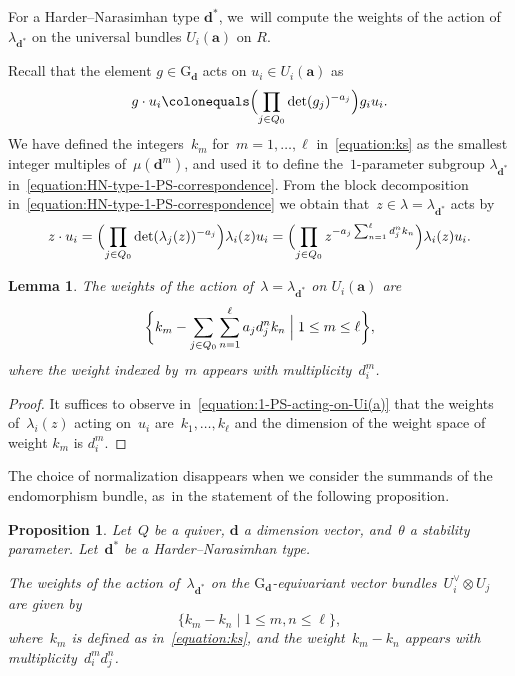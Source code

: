 \documentclass[JEP,XML,SOM,Unicode,NoEqCountersInSection,published]{cedram}
\theoremstyle{plain}
\newtheorem{lemma}[theorem]{Lemma}
\newtheorem{proposition}[theorem]{Proposition}
\theoremstyle{definition}
\newcommand\group[1][\tuple{d}]{\mathrm{G}_{#1}}
\newcommand\tuple[1]{\ensuremath{{\boldsymbol{#1}}}}
\begin{document}
For a Harder--Narasimhan type $\tuple{d}^*$, we~will compute the weights of the action of $\lambda_{\tuple{d}^*}$
on the universal bundles $U_i(\tuple{a})$ on $R$.

Recall that the element $g \in {\group}$ acts on $u_i \in U_i(\tuple{a})$ as
\begin{equation*}
g \cdot u_i \colonequals \Bigl(\prod_{j \in Q_0} \det(g_j)^{-a_j} \Bigr) g_i u_i.
\end{equation*}
We have defined the integers~$k_m$ for~$m=1,\ldots,\ell$ in~\eqref{equation:ks}
as the smallest integer multiples of~$\mu(\tuple{d}^m)$,
and used it to define the~$1$-parameter subgroup $\lambda_{\tuple{d}^*}$ in~\eqref{equation:HN-type-1-PS-correspondence}.
From the block decomposition in~\eqref{equation:HN-type-1-PS-correspondence}
we obtain that~$z\in\lambda=\lambda_{\tuple{d}^*}$ acts by
\begin{equation}
\label{equation:1-PS-acting-on-Ui(a)}
z \cdot u_i
= \Bigl(\prod_{j\in Q_0}\det(\lambda_j(z))^{-a_j}\Bigr)\lambda_i(z)u_i
= \Bigl(\prod_{j\in Q_0} z^{-a_j\sum_{n=1}^\ell d^n_j k_n}\Bigr) \lambda_i(z) u_i.
\end{equation}

\begin{lemma}
The weights of the action of~$\lambda=\lambda_{\tuple{d}^*}$
on $U_i(\tuple{a})$ are
\begin{equation}
\label{equation:weights-Ui(a)}
\biggl\{ k_m - \sum_{j \in Q_0} \sum_{n=1}^\ell a_j d^n_j k_n \Bigm| 1\leq m \leq \ell \biggr\},
\end{equation}
where the weight indexed by~$m$ appears with multiplicity~$d_i^m$.
\end{lemma}

\begin{proof}
It suffices to observe in~\eqref{equation:1-PS-acting-on-Ui(a)}
that the weights of~$\lambda_i(z)$ acting on~$u_i$ are~$k_1,\ldots,k_\ell$ and the dimension of the weight space of weight $k_m$ is $d_i^m$.
\end{proof}

The choice of normalization disappears when we consider the summands of the endomorphism bundle, as~in the statement of the following proposition.

\begin{proposition}
\label{proposition:weights-endomorphism-summands}
Let~$Q$ be a quiver,
$\tuple{d}$ a dimension vector,
and~$\theta$ a stability parameter.
Let~$\tuple{d}^*$ be a Harder--Narasimhan type.

The weights of the action of~$\lambda_{\tuple{d}^*}$
on the $\group$-equivariant vector bundles~$U_i^\vee\otimes U_j$
are given by
\begin{equation*}
\{ k_m - k_n\mid 1 \leq m,n \leq \ell \},
\end{equation*}
where~$k_m$ is defined as in~\eqref{equation:ks},
and the weight~$k_m-k_n$ appears with multiplicity~$d_i^md_j^n$.
\end{proposition}
\end{document}
